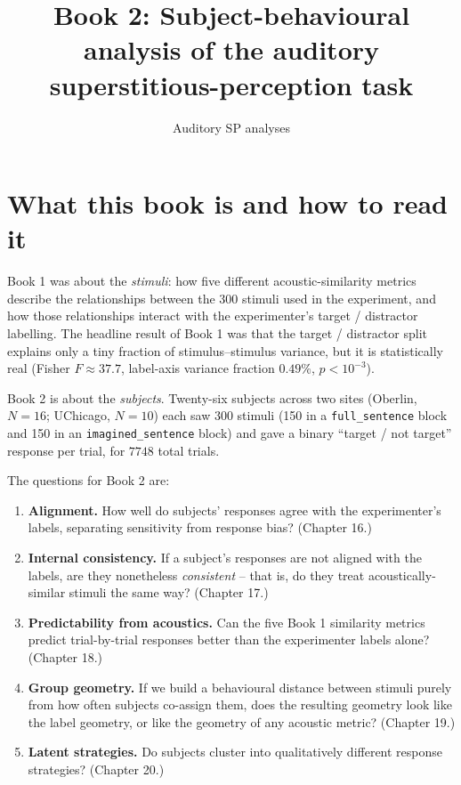 \documentclass[11pt]{article}
\title{Book 2: Subject-behavioural analysis of the auditory superstitious-perception task}
\author{Auditory SP analyses}
\date{}
\begin{document}
\maketitle
\tableofcontents
\bigskip

\section{What this book is and how to read it}

Book 1 was about the \emph{stimuli}: how five different acoustic-similarity
metrics describe the relationships between the 300 stimuli used in the
experiment, and how those relationships interact with the experimenter's
target / distractor labelling. The headline result of Book 1 was that the
target / distractor split explains only a tiny fraction of stimulus--stimulus
variance, but it is statistically real (Fisher $F\approx 37.7$, label-axis
variance fraction $0.49\%$, $p<10^{-3}$).

Book 2 is about the \emph{subjects}. Twenty-six subjects across two sites
(Oberlin, $N=16$; UChicago, $N=10$) each saw 300 stimuli (150 in a
\texttt{full\_sentence} block and 150 in an \texttt{imagined\_sentence} block)
and gave a binary ``target / not target'' response per trial, for $7748$
total trials.

The questions for Book 2 are:

\begin{enumerate}
\item \textbf{Alignment.} How well do subjects' responses agree with the
      experimenter's labels, separating sensitivity from response bias?
      (Chapter 16.)
\item \textbf{Internal consistency.} If a subject's responses are not aligned
      with the labels, are they nonetheless \emph{consistent} -- that is,
      do they treat acoustically-similar stimuli the same way?
      (Chapter 17.)
\item \textbf{Predictability from acoustics.} Can the five Book 1 similarity
      metrics predict trial-by-trial responses better than the experimenter
      labels alone? (Chapter 18.)
\item \textbf{Group geometry.} If we build a behavioural distance between
      stimuli purely from how often subjects co-assign them, does the
      resulting geometry look like the label geometry, or like the geometry
      of any acoustic metric? (Chapter 19.)
\item \textbf{Latent strategies.} Do subjects cluster into qualitatively
      different response strategies? (Chapter 20.)
\end{enumerate}
\end{document}
